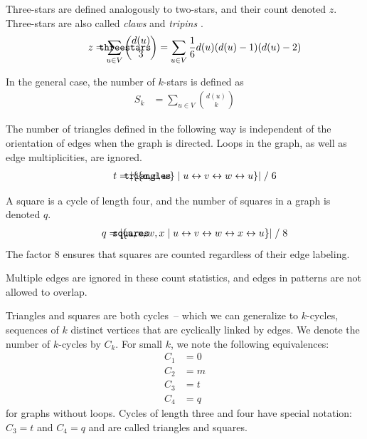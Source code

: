 \documentclass{article}
\def\mathnote#1{%
  \tag*{\rlap{\hspace\marginparsep\smash{\parbox[t]{\marginparwidth}{#1}}}}
}
\begin{document}
Three-stars are defined analogously to two-stars, and their count
denoted $z$.  Three-stars are also called \emph{claws} and
\emph{tripins} \citep[e.g.][]{b853}.   
\begin{align}
  \mathnote{\texttt{threestars}}
  z = \sum_{u \in V} {d(u) \choose 3} = \sum_{u \in V} \frac 1 6 d(u)
  (d(u) - 1) (d(u) - 2)
\end{align}

In the general case, the number of $k$-stars is defined as
\begin{align}
  S_k &= \sum_{u \in V} {d(u) \choose k}
\end{align}

The number of
triangles defined in the following way is independent of the orientation
of edges when the graph is directed.  Loops in the graph, as well as
edge multiplicities, are ignored.
\begin{align}
  \mathnote{\texttt{triangles}}
  t = | \{ \{u, v, w\} \mid u \leftrightarrow v \leftrightarrow w \leftrightarrow u \} | \;/\; 6
\end{align}

A square is a cycle of length four, and the number of squares in a graph
is denoted $q$.
\begin{align}
  \mathnote{\texttt{squares}}
  q = | \{ u, v, w, x \mid u \leftrightarrow v \leftrightarrow w \leftrightarrow x \leftrightarrow u \} | \;/\; 8
\end{align}
The factor 8 ensures that squares are counted regardless of their edge
labeling.  

Multiple edges are ignored in these count statistics, and edges in
patterns are not allowed to overlap. 

Triangles and squares are both cycles~-- which we can generalize to
$k$-cycles, sequences of $k$ distinct vertices that are cyclically
linked by edges.  We denote the number of $k$-cycles by $C_k$. 
For small $k$, we note the following equivalences: 
\begin{align*}
  C_1 &= 0 \\
  C_2 &= m \\
  C_3 &= t \\
  C_4 &= q
\end{align*}
for graphs without loops.  Cycles of length three and four have special
notation:  $C_3 = t$ and $C_4 = q$ and are called triangles and
squares. 
\end{document}
